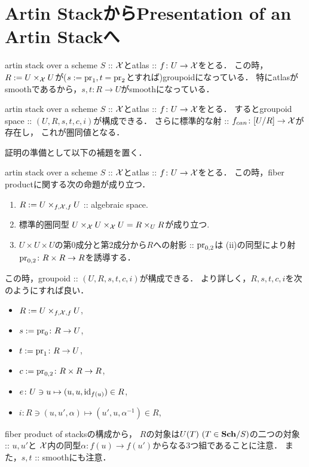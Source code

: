\documentclass[a4paper, dvipdfmx]{jsarticle}
\begin{document}
\section{Artin StackからPresentation of an Artin Stackへ}
    artin stack over a scheme $S$ :: $\stX$とatlas :: $f \colon U \to \stX$をとる．
    この時，$R:=U \times_{\stX} U$が($s:=\pr_1, t=\pr_2$とすれば)groupoidになっている．
    特にatlasがsmoothであるから，$s,t \colon R \to U$がsmoothになっている．

    \begin{Thm}[\cite{SP} 04T4, 04T5]
        artin stack over a scheme $S$ :: $\stX$とatlas :: $f \colon U \to \stX$をとる．
        するとgroupoid space :: $(U, R, s,t,c,i)$が構成できる．
        さらに標準的な射 :: $f_{can} \colon [U/R] \to \stX$が存在し，
        これが圏同値となる．
    \end{Thm}

    証明の準備として以下の補題を置く．

    \begin{Lemma}[\cite{SP} 04T4 (1)--(3)]\label{lemm:fiberprod}
        artin stack over a scheme $S$ :: $\stX$とatlas :: $f \colon U \to \stX$をとる．
        この時，fiber productに関する次の命題が成り立つ．
        \begin{enumerate}
            \item
                $R:=U \times_{f,\stX,f} U$ :: algebraic space.
            \item
                標準的圏同型 $U \times_{\stX} U \times_{\stX} U=R \times_{U} R$が成り立つ.
            \item
                $U \times U \times U$の第$0$成分と第$2$成分から$R$への射影 :: $\pr_{0,2}$は
                (ii)の同型により射$\pr_{0,2} \colon R \times R \to R$を誘導する．
        \end{enumerate}
    \end{Lemma}

    \begin{Lemma}[\cite{SP} 04T4 (4), 04T5 (1)]
        この時，groupoid :: $(U, R, s,t,c,i)$が構成できる．
        より詳しく，$R, s,t,c,i$を次のようにすれば良い．
        \begin{itemize}
            \item $R:=U \times_{f,\stX,f} U$,
            \item $s:=\pr_0 \colon R \to U$,
            \item $t:=\pr_1 \colon R \to U$,
            \item $c:=\pr_{0,2} \colon R \times R \to R$,
            \item $e \colon U \ni u  \mapsto (u,u,\id[f(u)]) \in R$,
            \item $i \colon R \ni (u,u',\alpha) \mapsto (u',u,\alpha^{-1}) \in R$,
        \end{itemize}
        fiber product of stacksの構成から，
        $R$の対象は$U(T)\ (T \in \Sch/S)$の二つの対象 :: $u, u'$と
        $\stX$内の同型$\alpha \colon f(u) \to f(u')$からなる$3$つ組であることに注意．
        また，$s,t$ :: smoothにも注意．
    \end{Lemma}
\end{document}
